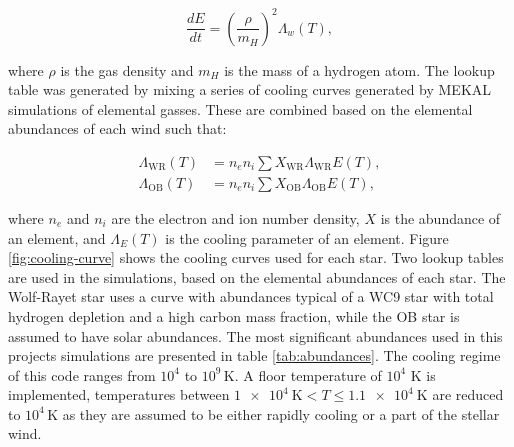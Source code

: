 \begin{equation}
  \frac{dE}{dt} = \left(\frac{\rho}{m_H}\right)^2 \Lambda_w(T),
\end{equation}

\noindent
where $\rho$ is the gas density and $m_H$ is the mass of a hydrogen atom.
The lookup table was generated by mixing a series of cooling curves generated by MEKAL simulations of elemental gasses.
These are combined based on the elemental abundances of each wind such that:

\begin{subequations}
  \begin{align}
    \Lambda_\text{WR}(T) & = n_e n_i \sum{X_\text{WR} \Lambda_\text{WR}{E}(T)}, \\
    \Lambda_\text{OB}(T) & = n_e n_i \sum{X_\text{OB} \Lambda_\text{OB}{E}(T)},
  \end{align}
\end{subequations}

\noindent
where $n_e$ and $n_i$ are the electron and ion number density, $X$ is the abundance of an element, and $\Lambda_E(T)$ is the cooling parameter of an element.
Figure \ref{fig:cooling-curve} shows the cooling curves used for each star.
Two lookup tables are used in the simulations, based on the elemental abundances of each star. 
The Wolf-Rayet star uses a curve with abundances typical of a WC9 star with total hydrogen depletion and a high carbon mass fraction, while the OB star is assumed to have solar abundances.
The most significant abundances used in this projects simulations are presented in table \ref{tab:abundances}.
The cooling regime of this code ranges from $10^4$ to $10^9\,\si{\kelvin}$.
A floor temperature of $10^4$ \si{\kelvin} is implemented, temperatures between $\SI{1e4}{\kelvin} < T \leq \SI{1.1e4}{\kelvin}$ are reduced to $10^4\,\si{\kelvin}$ as they are assumed to be either rapidly cooling or a part of the stellar wind.

